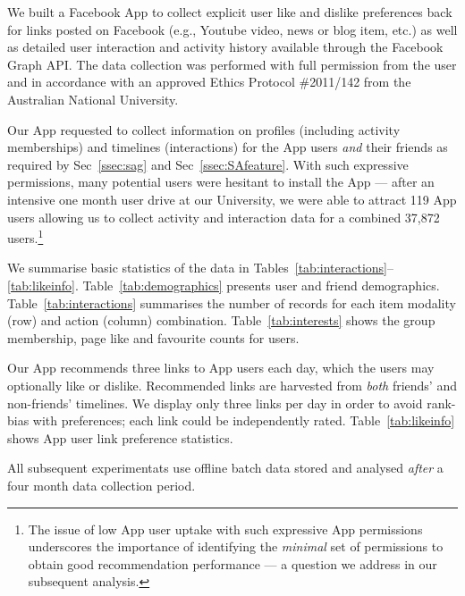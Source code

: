 
We built a Facebook App to collect explicit user like and dislike 
preferences back for links posted on Facebook (e.g., Youtube video,
news or blog item, etc.) as well as detailed user interaction and
activity history available through the Facebook Graph API.
The data collection was performed with full permission from the user
and in accordance with an approved Ethics Protocol 
\#2011/142 from the Australian National University.

Our App requested to collect information on profiles (including
activity memberships) and timelines (interactions) for the App
users \emph{and} their friends as required by Sec~\ref{ssec:sag} and
Sec~\ref{ssec:SAfeature}.  With such expressive permissions, many
potential users were hesitant to install the App --- after an
intensive one month user drive at our University, we were able to
attract 119 App users allowing us to collect activity and interaction
data for a combined 37,872 users.\footnote{The issue of low App user
uptake with such expressive App permissions underscores the importance
of identifying the \emph{minimal} set of permissions to obtain good
recommendation performance --- a question we address in our subsequent
analysis.}

We summarise basic statistics of the data in
Tables~\ref{tab:interactions}--\ref{tab:likeinfo}.
Table~\ref{tab:demographics} presents user and friend demographics.
Table~\ref{tab:interactions} summarises the number of
records for each item modality (row) and action (column)
combination. Table~\ref{tab:interests} shows the group membership,
page like and favourite counts for users.

Our App recommends three links to App users each day,
which the users may optionally like or dislike.  Recommended links are
harvested from
\emph{both} friends' and non-friends' timelines.
We display only three links per day in order to avoid rank-bias with
preferences; each link could be independently rated.
Table~\ref{tab:likeinfo} shows App user
link preference statistics.

All subsequent experimentats use offline
batch data stored and analysed \emph{after} a four
month data collection period.
      							
